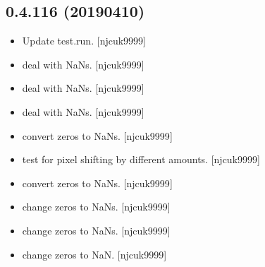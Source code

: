 \documentclass[a4paper,10pt,english]{report}
\begin{document}
\subsection{0.4.116 (2019\sphinxhyphen{}04\sphinxhyphen{}10)}
\label{\detokenize{misc/changelog:id163}}\begin{itemize}
\item {} 
Update test.run. {[}njcuk9999{]}

\item {} 
 \sphinxhyphen{} deal with NaNs. {[}njcuk9999{]}

\item {} 
 \sphinxhyphen{} deal with NaNs. {[}njcuk9999{]}

\item {} 
 \sphinxhyphen{} deal with NaNs. {[}njcuk9999{]}

\item {} 
 \sphinxhyphen{} convert zeros to NaNs. {[}njcuk9999{]}

\item {} 
 \sphinxhyphen{} test for pixel shifting by different amounts.
{[}njcuk9999{]}

\item {} 
 \sphinxhyphen{} convert zeros to NaNs. {[}njcuk9999{]}

\item {} 
 \sphinxhyphen{} change zeros to NaNs. {[}njcuk9999{]}

\item {} 
 \sphinxhyphen{} change zeros to NaNs. {[}njcuk9999{]}

\item {} 
 \sphinxhyphen{} change zeros to NaN. {[}njcuk9999{]}

\end{itemize}
\end{document}
